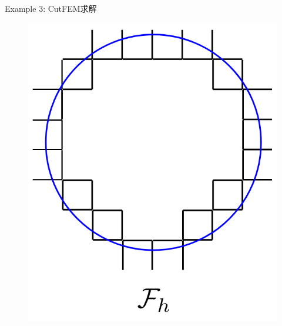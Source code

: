 \documentclass[lang=en,aspectratio=43,theme=default,logo=on]{simplebeamer}
\begin{document}
\begin{frame}{Example 3: CutFEM求解}
\begin{figure}
        \begin{minipage}[t]{0.5\linewidth}
            \centering
            \includegraphics[height=0.6\textheight]{./img/021.png}
        \end{minipage}
    \end{figure}
\end{frame}
\end{document}
